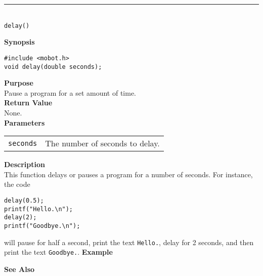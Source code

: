 \noindent
\vspace{5pt}
\rule{4.5in}{0.015in}\\
\noindent
{\LARGE \texttt{delay()}}\\
{}

\noindent
{\bf Synopsis}
\vspace{-8pt}
\begin{verbatim}
#include <mobot.h>
void delay(double seconds);
\end{verbatim}

\noindent
{\bf Purpose}\\
Pause a program for a set amount of time.\\

\noindent
{\bf Return Value}\\
None.\\

\noindent
{\bf Parameters}
\vspace{-0.1in}
\begin{description}
\item               
\begin{tabular}{p{15 mm}p{145 mm}}
\texttt{seconds} & The number of seconds to delay. \\
\end{tabular}
\end{description}

\noindent
{\bf Description}\\
This function delays or pauses a program for a number of seconds. For instance, 
the code 
\begin{verbatim}
delay(0.5);
printf("Hello.\n");
delay(2);
printf("Goodbye.\n");
\end{verbatim}
will pause for half a second, print the text \texttt{Hello.}, delay for 2 seconds,
and then print the text \texttt{Goodbye.}. 
\noindent
{\bf Example}\\
\noindent

\noindent
{\bf See Also}\\

